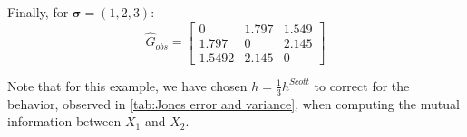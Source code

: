 \documentclass[../Thesis.tex]{subfiles}
\begin{document}


Finally, for $\boldsymbol\sigma = (1,2,3)$:
\begin{equation}\label{eq:Results - G_obs 3x3 - large s}
    \hat{G}_{obs} =
    \begin{bmatrix}
        0      & 1.797 & 1.549 \\
        1.797  & 0     & 2.145 \\
        1.5492 & 2.145 & 0
    \end{bmatrix}
\end{equation}



Note that for this example, we have chosen $h = \frac{1}{3} h^{Scott}$ to correct for the behavior, observed in \autoref{tab:Jones error and variance}, when computing the mutual information between $X_1$ and $X_2$.

\end{document}
